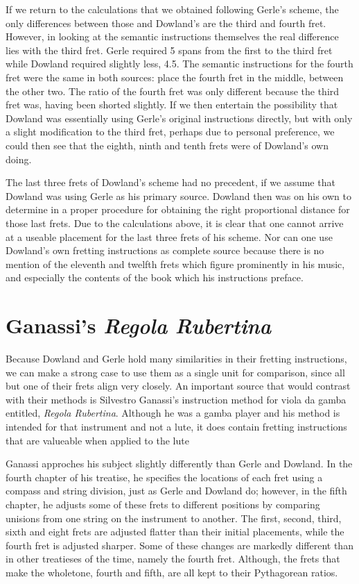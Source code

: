 If we return to the calculations that we obtained following Gerle's scheme, the
only differences between those and Dowland's are the third and fourth fret.
However, in looking at the semantic instructions themselves the real difference
lies with the third fret.  Gerle required 5 spans from the first to the third
fret while Dowland required slightly less, 4.5.  The semantic instructions for
the fourth fret were the same in both sources: place the fourth fret in the
middle, between the other two.  The ratio of the fourth fret was only different
because the third fret was, having been shorted slightly.  If we then entertain
the possibility that Dowland was essentially using Gerle's original instructions
directly, but with only a slight modification to the third fret, perhaps due to
personal preference, we could then see that the eighth, ninth and tenth frets
were of Dowland's own doing.

The last three frets of Dowland's scheme had no precedent, if we assume that
Dowland was using Gerle as his primary source.  Dowland then was on his own to
determine in a proper procedure for obtaining the right proportional distance
for those last frets.  Due to the calculations above, it is clear that one
cannot arrive at a useable placement for the last three frets of his scheme.
Nor can one use Dowland's own fretting instructions as complete source because
there is no mention of the eleventh and twelfth frets which figure prominently
in his music, and especially the contents of the book which his instructions
preface.

\section{Ganassi's \textit{Regola Rubertina}}

Because Dowland and Gerle hold many similarities in their fretting instructions, we can make
a strong case to use them as a single unit for comparison, since all but one of their frets
align very closely.  An important source that would contrast with their methods is Silvestro Ganassi's
instruction method for viola da gamba entitled, \textit{Regola Rubertina}.
Although he was a gamba player and his method is intended for
that instrument and not a lute, it does contain fretting instructions that are valueable
when applied to the lute

Ganassi approches his subject slightly differently than Gerle and Dowland.  In the fourth chapter
of his treatise, he specifies the locations of each fret using a compass and string division,
just as Gerle and Dowland do; however, in the fifth chapter, he adjusts some of these frets to different
positions by comparing unisions from one string on the instrument to another.  The first, second,
third, sixth and eight frets are adjusted flatter than their initial placements, while the fourth
fret is adjusted sharper.  Some of these changes are markedly different than in other treatieses
of the time, namely the fourth fret.  Although, the frets that make the wholetone, fourth
and fifth, are all kept to their Pythagorean ratios.

